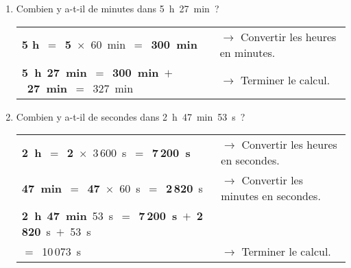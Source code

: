 \begin{methode*1}

\begin{exemple*1}

\begin{enumerate}
\item Combien y a-t-il de minutes dans 5 h 27 min ?

\begin{tabular}{ll} 
\textcolor{bleu}{\textbf{5 h}} $=$ \textcolor{bleu}{\textbf{5}} $\times$ 60 min $=$ \textcolor{bleu}{\textbf{300 min}}  & $\rightarrow$ Convertir les heures en minutes. \\
\textcolor{bleu}{\textbf{5 h}} \textcolor{vert}{\textbf{27 min}} $=$ \textcolor{bleu}{\textbf{300 min}} $+$ \textcolor{vert}{\textbf{27 min}} $=$ 327 min & $\rightarrow$ Terminer le calcul.\\
\end{tabular} 

\vspace{2em}\item Combien y a-t-il de secondes dans 2 h 47 min 53 s ?

\begin{tabular}{ll} 
\textcolor{bleu}{\textbf{2 h}} $=$ \textcolor{bleu}{\textbf{2}} $\times$ 3\,600 s $=$ \textcolor{bleu}{\textbf{7\,200 s}} & $\rightarrow$ Convertir les heures en secondes. \\
\textcolor{vert}{\textbf{47 min}} $=$ \textcolor{vert}{\textbf{47}} $\times$ 60 s $=$ \textcolor{vert}{\textbf{2\,820}} s & $\rightarrow$ Convertir les minutes en secondes. \\
\textcolor{bleu}{\textbf{2 h}} \textcolor{vert}{\textbf{47 min}} 53 s $=$ \textcolor{bleu}{\textbf{7\,200 s}} $+$ \textcolor{vert}{\textbf{2\,820}} s $+$ 53 s  \\
\phantom{2 h 47 min 53 si}$=$ 10\,073 s & $\rightarrow$ Terminer le calcul. \\
\end{tabular}

\end{enumerate}
 
\end{exemple*1}

\exercice

\end{methode*1}



